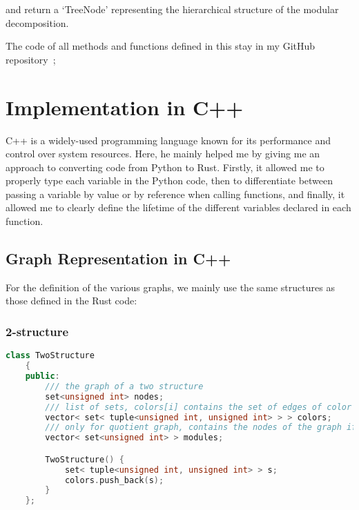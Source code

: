 and return a `TreeNode' representing the hierarchical structure of the modular decomposition.

\hspace{4cm}


The code of all methods and functions defined in this stay in my GitHub repository~\cite{rustcode};


\section{Implementation in C++}\label{sec:implementation-in-c++}

C++ is a widely-used programming language known for its performance and control over system resources.
Here, he mainly helped me by giving me an approach to converting code from Python to Rust.
Firstly, it allowed me to properly type each variable in the Python code, then to differentiate between passing a variable by value or by reference when calling functions, and finally, it allowed me to clearly define the lifetime of the different variables declared in each function.

\subsection{Graph Representation in C++}\label{subsec:graph-representation-in-c++}

For the definition of the various graphs, we mainly use the same structures as those defined in the Rust code:

\subsubsection{2-structure}

\begin{lstlisting}[language=C++, style=cpp, caption={Defining the 2-Structure}, label={lst:cpp-define-2-structure}, firstnumber=1]
    class TwoStructure
    {
    public:
        /// the graph of a two structure
        set<unsigned int> nodes;
        /// list of sets, colors[i] contains the set of edges of color i
        vector< set< tuple<unsigned int, unsigned int> > > colors;
        /// only for quotient graph, contains the nodes of the graph if they are modules they
        vector< set<unsigned int> > modules;

        TwoStructure() {
            set< tuple<unsigned int, unsigned int> > s;
            colors.push_back(s);
        }
    };
\end{lstlisting}

